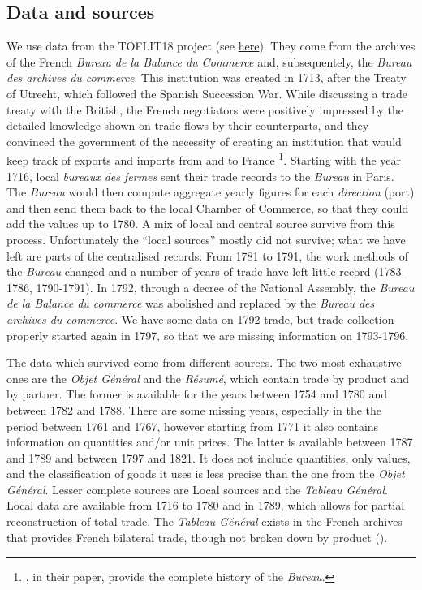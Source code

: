 \documentclass[12pt,a4paper,notitlepage,english]{article}
\begin{document}
\begin{appendix}
\section{Data and sources} \label{sec:dataset}
We use data from the TOFLIT18 project (see \href{http://toflit18.medialab.sciences-po.fr/\#/home}{here}). They come from the archives of the French \textit{Bureau de la Balance du Commerce} and, subsequentely, the \textit{Bureau des archives du commerce}.
This institution was created in 1713, after the Treaty of Utrecht, which followed the Spanish Succession War.
While discussing a trade treaty with the British, the French negotiators were positively impressed by the detailed knowledge shown on trade flows by their counterparts, and they convinced the government of the necessity of creating an institution that would keep track of exports and imports from and to France \citep{Charles2011}\footnote{\cite{Charles2011}, in their paper, provide the complete history of the \textit{Bureau}.}.
Starting with the year 1716, local \textit{bureaux des fermes} sent their trade records to the \textit{Bureau} in Paris.
The \textit{Bureau} would then compute aggregate yearly figures for each \textit{direction} (port) and then send them back to the local Chamber of Commerce, so that they could add the values up to 1780.
A mix of local and central source survive from this process. Unfortunately the ``local sources'' mostly did not survive; what we have left are parts of the centralised records.
From 1781 to 1791, the work methods of the \textit{Bureau} changed and a number of years of trade have left little record (1783-1786, 1790-1791).
In 1792, through a decree of the National Assembly, the \textit{Bureau de la Balance du commerce} was abolished and replaced by the \textit{Bureau des archives du commerce}. We have some data on 1792 trade, but trade collection properly started again in 1797, so that we are missing information on 1793-1796.

The data which survived come from different sources.
The two most exhaustive ones are the \textit{Objet Général} and the \textit{Résumé}, which contain trade by product and by partner. 
The former is available for the years between 1754 and 1780 and between 1782 and 1788. There are some missing years, especially in the the period between 1761 and 1767, however starting from 1771 it also contains information on quantities and/or unit prices.
The latter is available between 1787 and 1789 and between 1797 and 1821. It does not include quantities, only values, and the classification of goods it uses is less precise than the one from the \textit{Objet Général}.
Lesser complete sources are Local sources and the \textit{Tableau Général}. Local data are available from 1716 to 1780 and in 1789, which allows for partial reconstruction of total trade.
The \textit{Tableau Général} exists in the French archives that provides French bilateral trade, though not broken down by product (\cite{Romano1957}). 


\end{appendix}
\end{document}
